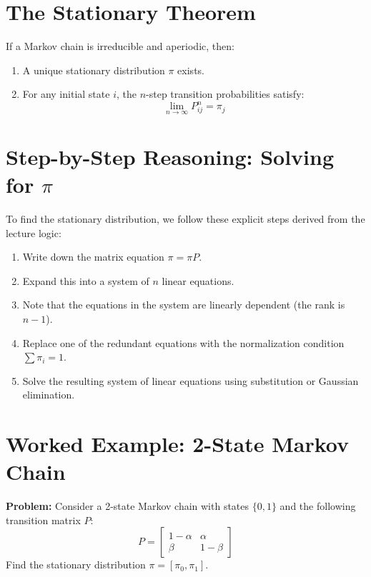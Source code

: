 \documentclass[11pt]{article}
\begin{document}
\section{The Stationary Theorem}
If a Markov chain is irreducible and aperiodic, then:
\begin{enumerate}
    \item A unique stationary distribution $\pi$ exists.
    \item For any initial state $i$, the $n$-step transition probabilities satisfy:
    \[ \lim_{n \to \infty} P_{ij}^n = \pi_j \]
\end{enumerate}

\section{Step-by-Step Reasoning: Solving for $\pi$}
To find the stationary distribution, we follow these explicit steps derived from the lecture logic:
\begin{enumerate}
    \item Write down the matrix equation $\pi = \pi P$.
    \item Expand this into a system of $n$ linear equations.
    \item Note that the equations in the system are linearly dependent (the rank is $n-1$).
    \item Replace one of the redundant equations with the normalization condition $\sum \pi_i = 1$.
    \item Solve the resulting system of linear equations using substitution or Gaussian elimination.
\end{enumerate}

\section{Worked Example: 2-State Markov Chain}
\textbf{Problem:} Consider a 2-state Markov chain with states $\{0, 1\}$ and the following transition matrix $P$:
\[ P = \begin{bmatrix} 1-\alpha & \alpha \\ \beta & 1-\beta \end{bmatrix} \]
Find the stationary distribution $\pi = [\pi_0, \pi_1]$.
\end{document}
